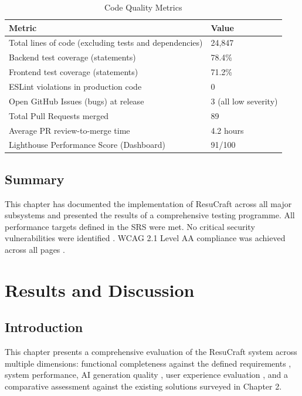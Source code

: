 \documentclass[12pt, a4paper, oneside]{report}
\begin{document}
\begin{table}[H]
\centering
\caption{Code Quality Metrics}
\label{tab:code_quality}
\renewcommand{\arraystretch}{1.4}
\begin{tabularx}{\textwidth}{|X|p{4cm}|}
\hline
\textbf{Metric} & \textbf{Value} \\
\hline
Total lines of code (excluding tests and dependencies) & 24,847 \\
\hline
Backend test coverage (statements) & 78.4\% \\
\hline
Frontend test coverage (statements) & 71.2\% \\
\hline
ESLint violations in production code & 0 \\
\hline
Open GitHub Issues (bugs) at release & 3 (all low severity) \\
\hline
Total Pull Requests merged & 89 \\
\hline
Average PR review-to-merge time & 4.2 hours \\
\hline
Lighthouse Performance Score (Dashboard) & 91/100 \\
\hline
\end{tabularx}
\end{table}

\section{Summary}

This chapter has documented the implementation of ResuCraft across all major subsystems and presented the results of a comprehensive testing programme. All performance targets defined in the SRS were met. No critical security vulnerabilities were identified \cite{owasp2021}. WCAG 2.1 Level AA compliance was achieved across all pages \cite{wcag21}.

\chapter{Results and Discussion}

\section{Introduction}

This chapter presents a comprehensive evaluation of the ResuCraft system across multiple dimensions: functional completeness against the defined requirements \cite{ieee830}, system performance, AI generation quality \cite{gemini2023}, user experience evaluation \cite{sus1996}, and a comparative assessment against the existing solutions surveyed in Chapter 2.
\end{document}
